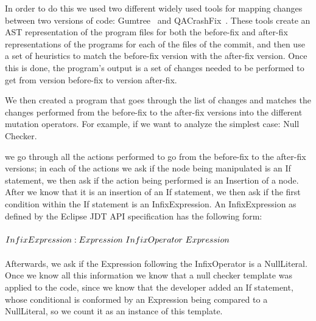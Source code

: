 \documentclass[conference]{IEEEtran}
\begin{document}
In order to do this we used two different widely used tools for mapping changes 
between two versions of code: Gumtree~\cite{falleri14} and QACrashFix~\cite{gao15}.
These tools create an AST representation of the program files for both the 
before-fix and after-fix representations of the programs for each of the files 
of the commit, and then use a set of heuristics to match the before-fix version 
with the after-fix version. Once this is done, the program's output is a set of 
changes needed to be performed to get from version before-fix to version 
after-fix.

We then created a program that goes through the list of changes and matches the changes performed from the before-fix to the after-fix versions into the different mutation operators. For example, if we want to analyze the simplest case: Null Checker.








we go through all the actions performed to go from the before-fix to the after-fix versions; in each of the actions we ask if the node being manipulated is an If statement, we then  ask if the action being performed is an Insertion of a node. After we know that it is an insertion of an If statement, we then ask if the first condition within the If statement is an InfixExpression. An InfixExpression as defined by the Eclipse JDT API specification has the following form:
\\
\\
$InfixExpression: \\
Expression~InfixOperator~Expression
$
\\
\\  
Afterwards, we ask if the Expression following the InfixOperator is a NullLiteral. Once we know all this information we know that a null checker template was applied to the code, since we know that the developer added an If statement, whose conditional is conformed by an Expression being compared to a NullLiteral, so we count it as an instance of this template.
\end{document}
